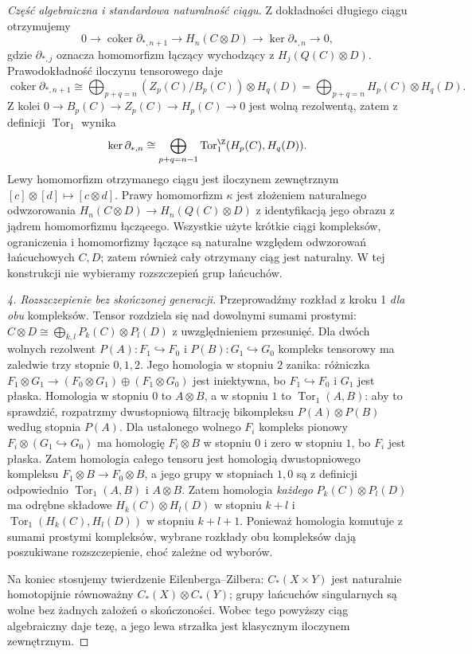 \begin{proof}[Część algebraiczna i standardowa naturalność ciągu]
Z dokładności długiego ciągu otrzymujemy
\[
 0\longrightarrow\operatorname{coker}\partial_{*,n+1}
 \longrightarrow H_n(C\otimes D)
 \longrightarrow\ker\partial_{*,n}\longrightarrow0,
\]
gdzie $\partial_{*,j}$ oznacza homomorfizm łączący
wychodzący z $H_j(Q(C)\otimes D)$.
Prawodokładność iloczynu tensorowego daje
\[
 \operatorname{coker}\partial_{*,n+1}
 \cong\bigoplus_{p+q=n}
 (Z_p(C)/B_p(C))\otimes H_q(D)
 =\bigoplus_{p+q=n}H_p(C)\otimes H_q(D).
\]
Z kolei $0\to B_p(C)\to Z_p(C)\to H_p(C)\to0$
jest wolną rezolwentą, zatem z definicji
$\operatorname{Tor}_1$ wynika
\[
 \ker\partial_{*,n}\cong
 \bigoplus_{p+q=n-1}
 \operatorname{Tor}_1^\Z(H_p(C),H_q(D)).
\]
Lewy homomorfizm otrzymanego ciągu jest iloczynem
zewnętrznym $[c]\otimes[d]\mapsto[c\otimes d]$.
Prawy homomorfizm $\kappa$ jest złożeniem naturalnego
odwzorowania $H_n(C\otimes D)\to H_n(Q(C)\otimes D)$
z identyfikacją jego obrazu z jądrem homomorfizmu
łączącego. Wszystkie użyte krótkie ciągi kompleksów,
ograniczenia i homomorfizmy łączące są naturalne względem
odwzorowań łańcuchowych $C,D$; zatem również cały
otrzymany ciąg jest naturalny. W tej konstrukcji nie
wybieramy rozszczepień grup łańcuchów.

\emph{4. Rozszczepienie bez skończonej generacji.}
Przeprowadźmy rozkład z kroku 1 \emph{dla obu} kompleksów.
Tensor rozdziela się nad dowolnymi sumami prostymi:
$C\otimes D\cong\bigoplus_{k,l}P_k(C)\otimes P_l(D)$
z uwzględnieniem przesunięć.
Dla dwóch wolnych rezolwent
$P(A):F_1\hookrightarrow F_0$ i
$P(B):G_1\hookrightarrow G_0$ kompleks tensorowy ma
zaledwie trzy stopnie $0,1,2$. Jego homologia w stopniu $2$
zanika: różniczka
$F_1\otimes G_1\to(F_0\otimes G_1)\oplus(F_1\otimes G_0)$
jest iniektywna, bo $F_1\hookrightarrow F_0$ i $G_1$
jest płaska. Homologia w stopniu $0$ to $A\otimes B$,
a w stopniu $1$ to $\operatorname{Tor}_1(A,B)$:
aby to sprawdzić, rozpatrzmy dwustopniową filtrację
bikompleksu $P(A)\otimes P(B)$ według stopnia $P(A)$.
Dla ustalonego wolnego $F_i$ kompleks pionowy
$F_i\otimes(G_1\hookrightarrow G_0)$ ma homologię
$F_i\otimes B$ w stopniu $0$ i zero w stopniu $1$,
bo $F_i$ jest płaska. Zatem homologia całego tensoru
jest homologią dwustopniowego kompleksu
$F_1\otimes B\to F_0\otimes B$, a jego grupy
w stopniach $1,0$ są z definicji odpowiednio
$\operatorname{Tor}_1(A,B)$ i $A\otimes B$. Zatem homologia \emph{każdego}
$P_k(C)\otimes P_l(D)$ ma odrębne składowe
$H_k(C)\otimes H_l(D)$ w stopniu $k+l$ i
$\operatorname{Tor}_1(H_k(C),H_l(D))$ w stopniu $k+l+1$.
Ponieważ homologia komutuje z sumami prostymi kompleksów,
wybrane rozkłady obu kompleksów dają poszukiwane
rozszczepienie, choć zależne od wyborów.

Na koniec stosujemy twierdzenie Eilenberga--Zilbera:
$C_*(X\times Y)$ jest naturalnie homotopijnie równoważny
$C_*(X)\otimes C_*(Y)$; grupy łańcuchów singularnych są wolne
bez żadnych założeń o skończoności. Wobec tego powyższy
ciąg algebraiczny daje tezę, a jego lewa strzałka jest
klasycznym iloczynem zewnętrznym.
\end{proof}
